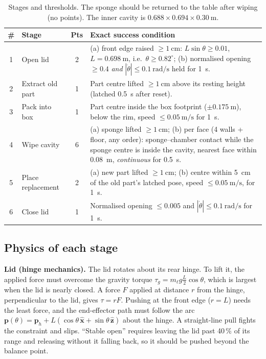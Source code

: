 \documentclass[10pt,a4paper]{article}
\begin{document}
\begin{table}[h]\centering\footnotesize
\begin{tabularx}{\textwidth}{@{}clcL@{}}
\toprule
\# & Stage & Pts & Exact success condition\\
 & Open lid & 2 & (a) front edge raised $\ge\SI{1}{\centi\metre}$: $L\sin\theta\ge0.01$, $L=\SI{0.698}{\metre}$, i.e.\ $\theta\ge0.82^\circ$; (b) normalised opening $\ge0.4$ \emph{and} $|\dot\theta|\le\SI{0.1}{\radian\per\second}$ held for \SI{1}{\second}.\\
2 & Extract old part & 1 & Part centre lifted $\ge\SI{1}{\centi\metre}$ above its resting height (latched \SI{0.5}{\second} after reset).\\
3 & Pack into box & 1 & Part centre inside the box footprint ($\pm\SI{0.175}{\metre}$), below the rim, speed $\le\SI{0.05}{\metre\per\second}$ for \SI{1}{\second}.\\
4 & Wipe cavity & 6 & (a) sponge lifted $\ge\SI{1}{\centi\metre}$; (b) per face (4 walls + floor, any order): sponge--chamber contact while the sponge centre is inside the cavity, nearest face within \SI{0.08}{\metre}, \emph{continuous} for \SI{0.5}{\second}.\\
5 & Place replacement & 2 & (a) new part lifted $\ge\SI{1}{\centi\metre}$; (b) centre within \SI{5}{\centi\metre} of the old part's latched pose, speed $\le\SI{0.05}{\metre\per\second}$, for \SI{1}{\second}.\\
6 & Close lid & 1 & Normalised opening $\le0.005$ and $|\dot\theta|\le\SI{0.1}{\radian\per\second}$ for \SI{1}{\second}.\\
\bottomrule
\end{tabularx}
\caption{Stages and thresholds. The sponge should be returned to the table after wiping (no points). The inner cavity is $0.688\times0.694\times\SI{0.30}{\metre}$.}
\label{tab:stages}
\end{table}

\subsection{Physics of each stage}
\textbf{Lid (hinge mechanics).} The lid rotates about its rear hinge. To lift it, the applied force must overcome the gravity torque $\tau_g=m_\ell g\frac L2\cos\theta$, which is largest when the lid is nearly closed. A force $F$ applied at distance $r$ from the hinge, perpendicular to the lid, gives $\tau=rF$. Pushing at the front edge ($r=L$) needs the least force, and the end-effector path must follow the arc $\bm p(\theta)=\bm p_h+L(\cos\theta\,\hat{\bm x}+\sin\theta\,\hat{\bm z})$ about the hinge. A straight-line pull fights the constraint and slips. ``Stable open'' requires leaving the lid past 40\,\% of its range and releasing without it falling back, so it should be pushed beyond the balance point.
\end{document}
